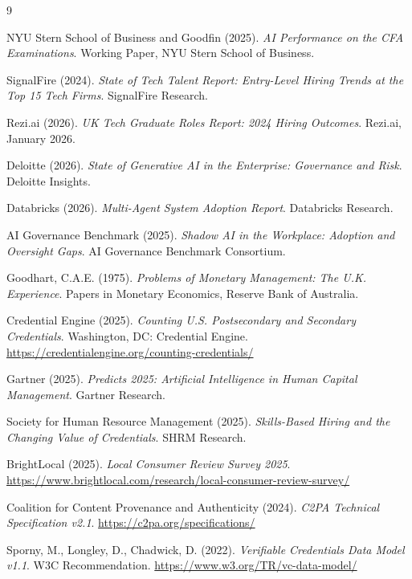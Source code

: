 \documentclass[11pt,a4paper]{article}
\begin{document}
\begin{thebibliography}{9}

NYU Stern School of Business and Goodfin (2025).
\textit{AI Performance on the CFA Examinations}.
Working Paper, NYU Stern School of Business.

SignalFire (2024).
\textit{State of Tech Talent Report: Entry-Level Hiring Trends at the Top 15 Tech Firms}.
SignalFire Research.

Rezi.ai (2026).
\textit{UK Tech Graduate Roles Report: 2024 Hiring Outcomes}.
Rezi.ai, January 2026.

Deloitte (2026).
\textit{State of Generative AI in the Enterprise: Governance and Risk}.
Deloitte Insights.

Databricks (2026).
\textit{Multi-Agent System Adoption Report}.
Databricks Research.

AI Governance Benchmark (2025).
\textit{Shadow AI in the Workplace: Adoption and Oversight Gaps}.
AI Governance Benchmark Consortium.

Goodhart, C.A.E. (1975).
\textit{Problems of Monetary Management: The U.K. Experience}.
Papers in Monetary Economics, Reserve Bank of Australia.

Credential Engine (2025).
\textit{Counting U.S. Postsecondary and Secondary Credentials}.
Washington, DC: Credential Engine.
\url{https://credentialengine.org/counting-credentials/}

Gartner (2025).
\textit{Predicts 2025: Artificial Intelligence in Human Capital Management}.
Gartner Research.

Society for Human Resource Management (2025).
\textit{Skills-Based Hiring and the Changing Value of Credentials}.
SHRM Research.

BrightLocal (2025).
\textit{Local Consumer Review Survey 2025}.
\url{https://www.brightlocal.com/research/local-consumer-review-survey/}

Coalition for Content Provenance and Authenticity (2024).
\textit{C2PA Technical Specification v2.1}.
\url{https://c2pa.org/specifications/}

Sporny, M., Longley, D., Chadwick, D. (2022).
\textit{Verifiable Credentials Data Model v1.1}.
W3C Recommendation. \url{https://www.w3.org/TR/vc-data-model/}


\end{thebibliography}
\end{document}
